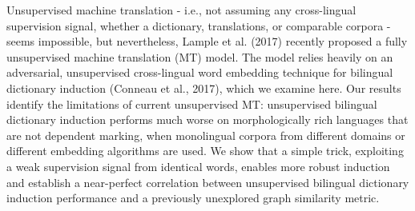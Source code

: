 Unsupervised machine translation - i.e., not assuming any cross-lingual supervision signal, whether a dictionary, translations, or comparable corpora - seems impossible, but nevertheless, Lample et al. (2017) recently proposed a fully unsupervised machine translation (MT) model. The model relies heavily on an adversarial, unsupervised cross-lingual word embedding technique for bilingual dictionary induction (Conneau et al., 2017), which we examine here. Our results identify the limitations of current unsupervised MT: unsupervised bilingual dictionary induction performs much worse on morphologically rich languages that are not dependent marking, when monolingual corpora from different domains or different embedding algorithms are used. We show that a simple trick, exploiting a weak supervision signal from identical words, enables more robust induction and establish a near-perfect correlation between unsupervised bilingual dictionary induction performance and a previously unexplored graph similarity metric.
